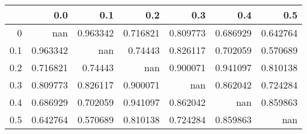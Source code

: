\begin{tabular}{rrrrrrr}
\toprule
     &        0.0 &        0.1 &        0.2 &        0.3 &        0.4 &        0.5 \\
\midrule
 0   & nan        &   0.963342 &   0.716821 &   0.809773 &   0.686929 &   0.642764 \\
 0.1 &   0.963342 & nan        &   0.74443  &   0.826117 &   0.702059 &   0.570689 \\
 0.2 &   0.716821 &   0.74443  & nan        &   0.900071 &   0.941097 &   0.810138 \\
 0.3 &   0.809773 &   0.826117 &   0.900071 & nan        &   0.862042 &   0.724284 \\
 0.4 &   0.686929 &   0.702059 &   0.941097 &   0.862042 & nan        &   0.859863 \\
 0.5 &   0.642764 &   0.570689 &   0.810138 &   0.724284 &   0.859863 & nan        \\
\bottomrule
\end{tabular}